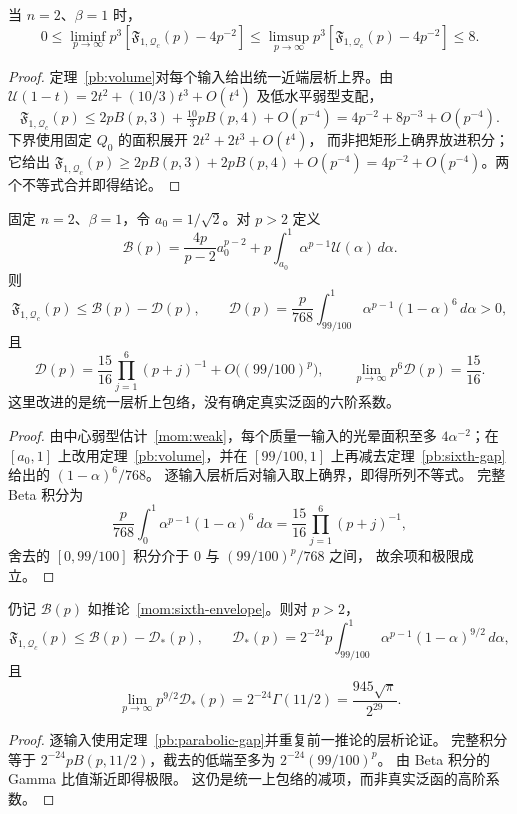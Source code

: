 \begin{corollary}[二维半阶的全体高矩次阶夹逼]\label{mom:pair-bracket}
当 $n=2$、$\beta=1$ 时，
\[
 0\le\liminf_{p\to\infty}p^3[\mathfrak F_{1,\mathcal Q_c}(p)-4p^{-2}]
 \le\limsup_{p\to\infty}p^3[\mathfrak F_{1,\mathcal Q_c}(p)-4p^{-2}]\le8.
\]
\end{corollary}
\begin{proof}
定理~\ref{pb:volume}对每个输入给出统一近端层析上界。由
$\mathcal U(1-t)=2t^2+(10/3)t^3+O(t^4)$ 及低水平弱型支配，
\[
 \mathfrak F_{1,\mathcal Q_c}(p)
 \le2pB(p,3)+\tfrac{10}{3}pB(p,4)+O(p^{-4})
 =4p^{-2}+8p^{-3}+O(p^{-4}).
\]
下界使用固定 $Q_0$ 的面积展开 $2t^2+2t^3+O(t^4)$，
而非把矩形上确界放进积分；它给出
$\mathfrak F_{1,\mathcal Q_c}(p)\ge2pB(p,3)+2pB(p,4)+O(p^{-4})
=4p^{-2}+O(p^{-4})$。两个不等式合并即得结论。
\end{proof}


\begin{corollary}[高矩层析包络的显式改进]\label{mom:sixth-envelope}
固定 $n=2$、$\beta=1$，令 $a_0=1/\sqrt2$。对 $p>2$ 定义
\[
 \mathcal B(p)=\frac{4p}{p-2}a_0^{p-2}
 +p\int_{a_0}^1\alpha^{p-1}\mathcal U(\alpha)\,d\alpha.
\]
则
\[
 \mathfrak F_{1,\mathcal Q_c}(p)\le\mathcal B(p)-\mathcal D(p),\qquad
 \mathcal D(p)=\frac p{768}\int_{99/100}^1\alpha^{p-1}(1-\alpha)^6\,d\alpha>0,
\]
且
\[
 \mathcal D(p)=\frac{15}{16}\prod_{j=1}^6(p+j)^{-1}
 +O\bigl((99/100)^p\bigr),\qquad
 \lim_{p\to\infty}p^6\mathcal D(p)=\frac{15}{16}.
\]
这里改进的是统一层析上包络，没有确定真实泛函的六阶系数。
\end{corollary}
\begin{proof}
由中心弱型估计~\eqref{mom:weak}，每个质量一输入的光晕面积至多
$4\alpha^{-2}$；在 $[a_0,1]$ 上改用定理~\ref{pb:volume}，并在
$[99/100,1]$ 上再减去定理~\ref{pb:sixth-gap}给出的 $(1-\alpha)^6/768$。
逐输入层析后对输入取上确界，即得所列不等式。
完整 Beta 积分为
\[
 \frac p{768}\int_0^1\alpha^{p-1}(1-\alpha)^6\,d\alpha
 =\frac{15}{16}\prod_{j=1}^6(p+j)^{-1},
\]
舍去的 $[0,99/100]$ 积分介于 $0$ 与 $(99/100)^p/768$ 之间，
故余项和极限成立。
\end{proof}


\begin{corollary}[抛物邻域对高矩包络的改进]\label{mom:parabolic-envelope}
仍记 $\mathcal B(p)$ 如推论~\ref{mom:sixth-envelope}。则对 $p>2$，
\[
 \mathfrak F_{1,\mathcal Q_c}(p)\le\mathcal B(p)-\mathcal D_*(p),\qquad
 \mathcal D_*(p)=2^{-24}p\int_{99/100}^1\alpha^{p-1}(1-\alpha)^{9/2}\,d\alpha,
\]
且
\[
 \lim_{p\to\infty}p^{9/2}\mathcal D_*(p)
 =2^{-24}\Gamma(11/2)=\frac{945\sqrt\pi}{2^{29}}.
\]
\end{corollary}
\begin{proof}
逐输入使用定理~\ref{pb:parabolic-gap}并重复前一推论的层析论证。
完整积分等于 $2^{-24}pB(p,11/2)$，截去的低端至多为 $2^{-24}(99/100)^p$。
由 Beta 积分的 Gamma 比值渐近即得极限。
这仍是统一上包络的减项，而非真实泛函的高阶系数。
\end{proof}


